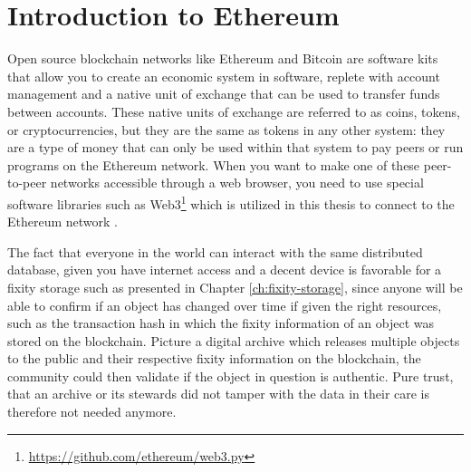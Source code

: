 \section{Introduction to Ethereum}
\label{sec:eth-blockchain}
Open source blockchain networks like Ethereum and Bitcoin are software kits that allow you to create an economic system in software, replete with account management and a native unit of exchange that can be used to transfer funds between accounts. These native units of exchange are referred to as coins, tokens, or cryptocurrencies, but they are the same as tokens in any other system: they are a type of money that can only be used within that system to pay peers or run programs on the Ethereum network.
When you want to make one of these peer-to-peer networks accessible through a web browser, you need to use special software libraries such as Web3\footnote{\url{https://github.com/ethereum/web3.py}} which is utilized in this thesis to connect to the Ethereum network \cite[2]{dannen2017introducing}.

The fact that everyone in the world can interact with the same distributed database, given you have internet access and a decent device is favorable for a fixity storage such as presented in Chapter \ref{ch:fixity-storage}, since anyone will be able to confirm if an object has changed over time if given the right resources, such as the transaction hash in which the fixity information of an object was stored on the blockchain. Picture a digital archive which releases multiple objects to the public and their respective fixity information on the blockchain, the community could then validate if the object in question is authentic. Pure trust, that an archive or its stewards did not tamper with the data in their care is therefore not needed anymore.
